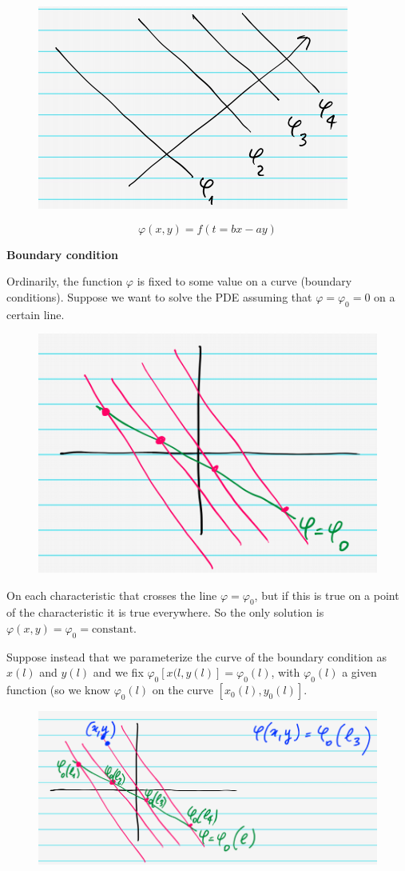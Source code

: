 \documentclass{article}
\begin{document}
\begin{figure}[h]
    \centering
    \includegraphics[width=0.4\linewidth]{fig52.png}
\end{figure}

\begin{equation}
    \varphi(x,y) = f(t = bx-ay)
\end{equation}

\noindent
\textbf{Boundary condition}

\noindent
Ordinarily, the function $\varphi$ is fixed to some value on a curve (boundary conditions). Suppose we want to solve the PDE assuming that $\varphi = \varphi_0 = 0$ on a certain line.

\begin{figure}[h]
    \centering
    \includegraphics[width=0.4\linewidth]{fig53.png}
\end{figure}

\noindent
On each characteristic that crosses the line $\varphi = \varphi_0$,  but if this is true on a point of the characteristic it is true everywhere. So the only solution is $\varphi(x,y) = \varphi_0 = \text{constant}$.

\noindent
Suppose instead that we parameterize the curve of the boundary condition as $x(l)$ and $y(l)$ and we fix $\varphi_0 [x(l, y(l)]=  \varphi_0(l)$, with $\varphi_0(l)$ a given function (so we know $\varphi_0 (l)$ on the curve $[x_0 (l), y_0 (l)]$.

\begin{figure}[h]
    \centering
    \includegraphics[width=0.6\linewidth]{fig54.png}
\end{figure}
\end{document}
